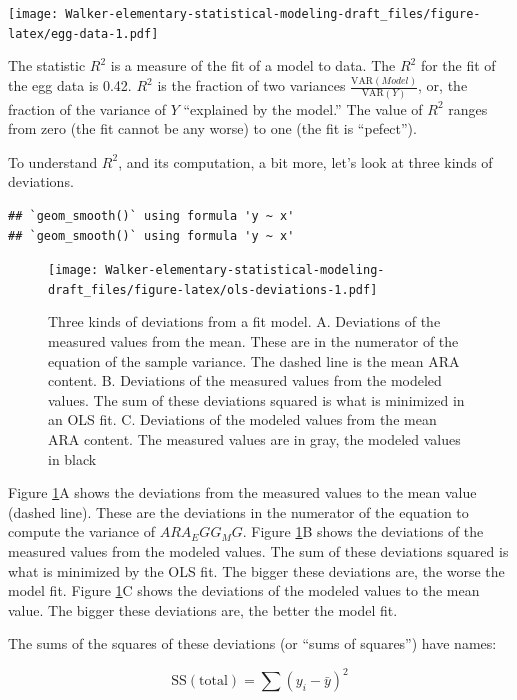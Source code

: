 \documentclass[]{book}
\begin{document}
\texttt{[image: Walker-elementary-statistical-modeling-draft\_files/figure-latex/egg-data-1.pdf]}

The statistic \(R^2\) is a measure of the fit of a model to data. The \(R^2\) for the fit of the egg data is 0.42. \(R^2\) is the fraction of two variances \(\frac{\mathrm{VAR}(Model)}{\mathrm{VAR}(Y)}\), or, the fraction of the variance of \(Y\) ``explained by the model.'' The value of \(R^2\) ranges from zero (the fit cannot be any worse) to one (the fit is ``pefect'').

To understand \(R^2\), and its computation, a bit more, let's look at three kinds of deviations.

\begin{verbatim}
## `geom_smooth()` using formula 'y ~ x'
## `geom_smooth()` using formula 'y ~ x'
\end{verbatim}

\begin{figure}
\centering
\texttt{[image: Walker-elementary-statistical-modeling-draft\_files/figure-latex/ols-deviations-1.pdf]}
\caption{\label{fig:ols-deviations}Three kinds of deviations from a fit model. A. Deviations of the measured values from the mean. These are in the numerator of the equation of the sample variance. The dashed line is the mean ARA content. B. Deviations of the measured values from the modeled values. The sum of these deviations squared is what is minimized in an OLS fit. C. Deviations of the modeled values from the mean ARA content. The measured values are in gray, the modeled values in black}
\end{figure}

Figure \ref{fig:ols-deviations}A shows the deviations from the measured values to the mean value (dashed line). These are the deviations in the numerator of the equation to compute the variance of \(ARA_EGG_MG\). Figure \ref{fig:ols-deviations}B shows the deviations of the measured values from the modeled values. The sum of these deviations squared is what is minimized by the OLS fit. The bigger these deviations are, the worse the model fit. Figure \ref{fig:ols-deviations}C shows the deviations of the modeled values to the mean value. The bigger these deviations are, the better the model fit.

The sums of the squares of these deviations (or ``sums of squares'') have names:

\begin{equation}
\mathrm{SS(total)} = \sum{(y_i - \bar{y})^2}
\end{equation}
\end{document}
